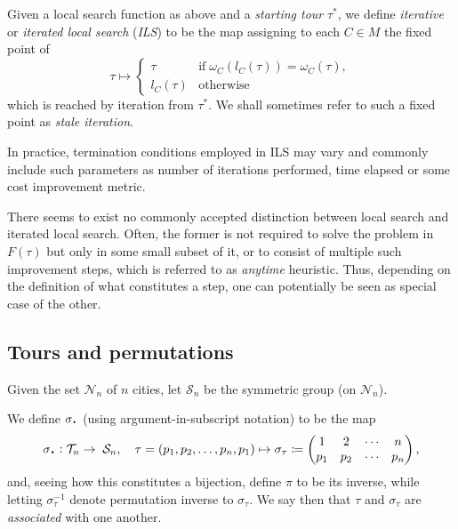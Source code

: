 \documentclass[index=totoc,bibliography=totoc]{scrartcl}
\newcommand*{\Cdot}{\raisebox{-0.30ex}{\scalebox{1.5}{$\cdot$}}}
\numberwithin{equation}{section}
\numberwithin{figure}{section}
\numberwithin{table}{section}
\let\defstyle\itshape
\begin{document}
\begin{define}[ILS]
\label{def:ils}
  Given a local search function as above and a {\defstyle starting tour}
  $\tau^\ast$, we define {\defstyle iterative} or {\defstyle iterated local search}
  ({\defstyle ILS}) to be the map assigning to each $C \in M$ the
  fixed point of
  \[
    \tau \mapsto
    \begin{cases}
      \tau \quad & \text{if} \;
      \omega_C\left(l_C\left(\tau\right)\right) = \omega_C\left(\tau\right),
      \\
      l_C\left(\tau\right) & \text{otherwise}
    \end{cases}
  \]
  which is reached by iteration from $\tau^\ast$.
  We shall sometimes refer to such a fixed point as {\defstyle stale iteration}.
\end{define}

In practice, termination conditions employed in ILS may vary and commonly
include such parameters as number of iterations performed, time elapsed
or some cost improvement metric.

\begin{remark}
  There seems to exist no commonly accepted distinction between local
  search and iterated local search.  Often, the former is not required to
  solve the problem in $F\left(\tau\right)$ but only in some small subset
  of it, or to consist of multiple such improvement steps, which is
  referred to as {\defstyle anytime} heuristic.  Thus, depending on the
  definition of what constitutes a step, one can potentially be seen as
  special case of the other.
\end{remark}

\subsection{Tours and permutations}

Given the set $\mathcal{N}_n$ of $n$ cities, let $\mathcal{S}_n$ be the symmetric group (on $\mathcal{N}_n$).

\begin{define}
  We define $\sigma_{\Cdot}$ (using argument-in-subscript notation) to be the map
  \[
      \sigma_{\Cdot} :
      \mathcal{T}_n \to \; \mathcal{S}_n, \quad
      \tau = \left(p_1, p_2, \ldots, p_n, p_1 \right)
      \mapsto
    \sigma_\tau \coloneqq
    \begin{pmatrix}
      1 & 2 & \cdots & n \\
      p_1 & p_2 & \cdots &  p_n
    \end{pmatrix},
  \]
  and, seeing how this constitutes a bijection, define $\pi$ to be its inverse,
  while letting $\sigma_\tau^{-1}$ denote permutation inverse to $\sigma_\tau$.
  We say then that $\tau$ and $\sigma_\tau$ are {\defstyle associated} with one another.
\end{define}
\end{document}
